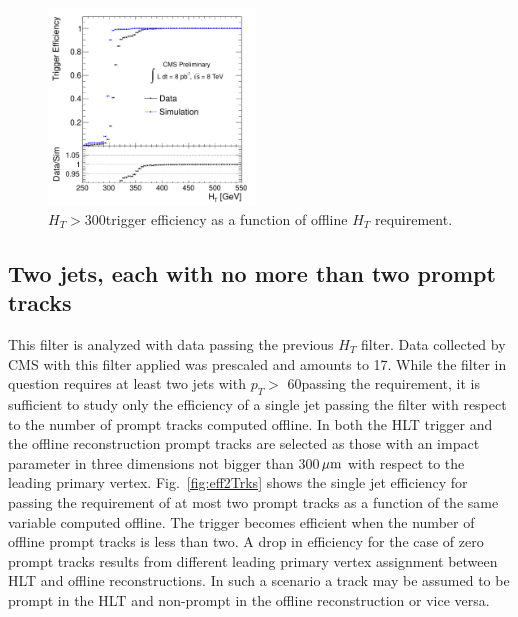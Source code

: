 \begin{figure}[htbp]
\centering
 \includegraphics[width=0.49\textwidth]{plots/trigger/effHT300.pdf}
\caption{$H_T>$300\GeV trigger efficiency as a function of offline $H_T$ requirement. \label{fig:effHT300}}
\end{figure} 

\subsection{Two jets, each with no more than two prompt tracks}
\label{subsec:trig2Trks}

This filter is analyzed with data passing the previous 
$H_T$ filter. Data collected by CMS with this filter applied was prescaled and 
amounts to 17\pbinv.  
While the filter in question
 requires at least two jets with $p_T>$ 60\GeV passing the requirement, it is sufficient to study
 only the efficiency
 of a single jet passing the filter with respect to the number of prompt tracks computed offline.
 In both the HLT trigger and the offline
 reconstruction prompt tracks are selected as those with an impact parameter in three
 dimensions 
not bigger than 300$\,\mu\text{m}$
 with respect to the leading primary vertex. Fig.~\ref{fig:eff2Trks} shows the single jet efficiency for passing
 the requirement of at most two prompt tracks as a function of the same variable computed offline.
 The trigger becomes efficient when the number of offline prompt tracks is less than two. 
A drop in efficiency for the case of zero prompt tracks results from different leading primary vertex assignment 
between HLT and offline reconstructions. 
In such a scenario a track may be assumed to be prompt in the HLT and non-prompt
 in the offline reconstruction or vice versa. 
  

